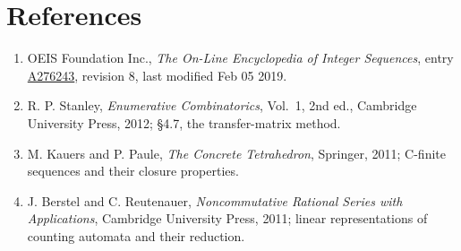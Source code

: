 \documentclass[11pt]{article}
\theoremstyle{definition}
\begin{document}
\section{References}

\begin{enumerate}

\item OEIS Foundation Inc., \emph{The On-Line Encyclopedia of Integer Sequences}, entry \href{https://oeis.org/A276243}{A276243}, revision 8, last modified Feb 05 2019.

\item R. P. Stanley, \emph{Enumerative Combinatorics}, Vol.~1, 2nd ed., Cambridge University Press, 2012; \S4.7, the transfer-matrix method.

\item M. Kauers and P. Paule, \emph{The Concrete Tetrahedron}, Springer, 2011; C-finite sequences and their closure properties.

\item J. Berstel and C. Reutenauer, \emph{Noncommutative Rational Series with Applications}, Cambridge University Press, 2011; linear representations of counting automata and their reduction.

\end{enumerate}
\end{document}
